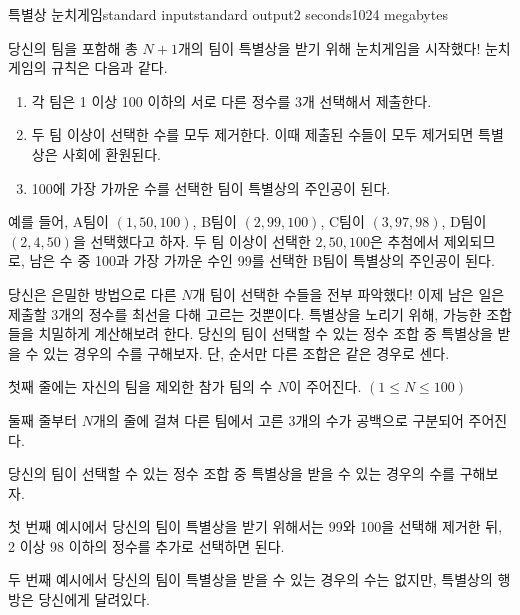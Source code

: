 \begin{problem}{특별상 눈치게임}{standard input}{standard output}{2 seconds}{1024 megabytes}

당신의 팀을 포함해 총 $N+1$개의 팀이 특별상을 받기 위해 눈치게임을 시작했다! 눈치게임의 규칙은 다음과 같다.

\begin{enumerate}
    \item 각 팀은 1 이상 100 이하의 서로 다른 정수를 3개 선택해서 제출한다.
    \item 두 팀 이상이 선택한 수를 모두 제거한다. 이때 제출된 수들이 모두 제거되면 특별상은 사회에 환원된다.
    \item 100에 가장 가까운 수를 선택한 팀이 특별상의 주인공이 된다.
\end{enumerate}

예를 들어, A팀이 $(1, 50, 100)$, B팀이 $(2, 99, 100)$, C팀이 $(3, 97, 98)$, D팀이 $(2, 4, 50)$을 선택했다고 하자. 두 팀 이상이 선택한 $2, 50, 100$은 추첨에서 제외되므로, 남은 수 중 100과 가장 가까운 수인 99를 선택한 B팀이 특별상의 주인공이 된다.

당신은 은밀한 방법으로 다른 $N$개 팀이 선택한 수들을 전부 파악했다! 이제 남은 일은 제출할 3개의 정수를 최선을 다해 고르는 것뿐이다. 특별상을 노리기 위해, 가능한 조합들을 치밀하게 계산해보려 한다. 당신의 팀이 선택할 수 있는 정수 조합 중 특별상을 받을 수 있는 경우의 수를 구해보자. 단, 순서만 다른 조합은 같은 경우로 센다.

\InputFile
첫째 줄에는 자신의 팀을 제외한 참가 팀의 수 $N$이 주어진다. $(1 \leq N \leq 100)$

둘째 줄부터 $N$개의 줄에 걸쳐 다른 팀에서 고른 3개의 수가 공백으로 구분되어 주어진다.

\OutputFile
당신의 팀이 선택할 수 있는 정수 조합 중 특별상을 받을 수 있는 경우의 수를 구해보자.


\Examples

\begin{example}
%
%
%
\end{example}

\Note
첫 번째 예시에서 당신의 팀이 특별상을 받기 위해서는 99와 100을 선택해 제거한 뒤, 2 이상 98 이하의 정수를 추가로 선택하면 된다.

두 번째 예시에서 당신의 팀이 특별상을 받을 수 있는 경우의 수는 없지만, 특별상의 행방은 당신에게 달려있다.

\end{problem}

